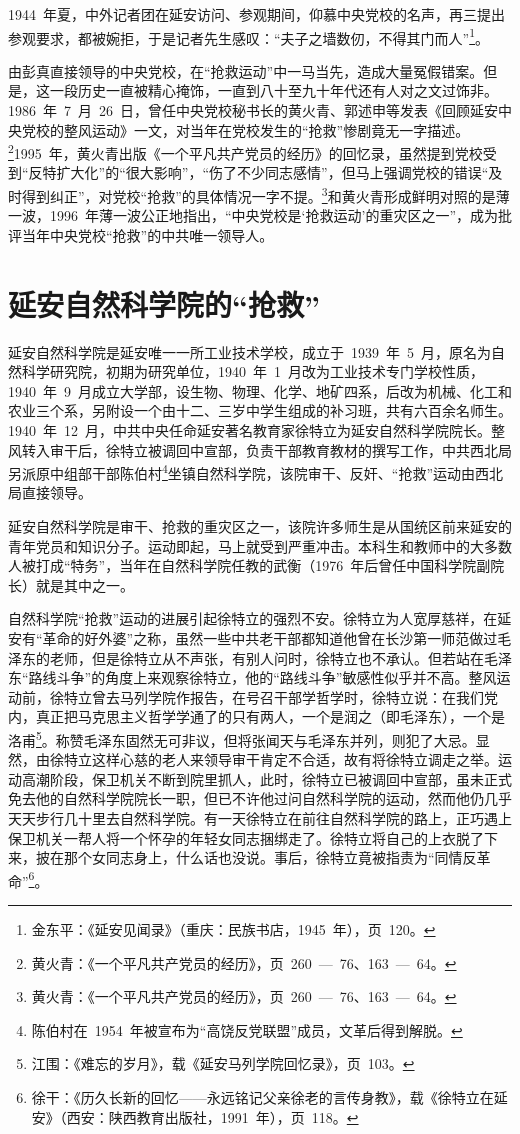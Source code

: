1944~年夏，中外记者团在延安访问、参观期间，仰慕中央党校的名声，再三提出参观要求，都被婉拒，于是记者先生感叹：“夫子之墙数仞，不得其门而人”\footnote{金东平：《延安见闻录》（重庆：民族书店，1945~年），页~120。}。

由彭真直接领导的中央党校，在“抢救运动”中一马当先，造成大量冤假错案。但是，这一段历史一直被精心掩饰，一直到八十至九十年代还有人对之文过饰非。1986~年~7~月~26~日，曾任中央党校秘书长的黄火青、郭述申等发表《回顾延安中央党校的整风运动》一文，对当年在党校发生的“抢救”惨剧竟无一字描述。\footnote{黄火青：《一个平凡共产党员的经历》，页~260~—~76、163~—~64。}1995~年，黄火青出版《一个平凡共产党员的经历》的回忆录，虽然提到党校受到“反特扩大化”的“很大影响”，“伤了不少同志感情”，但马上强调党校的错误“及时得到纠正”，对党校“抢救”的具体情况一字不提。\footnote{黄火青：《一个平凡共产党员的经历》，页~260~—~76、163~—~64。}和黄火青形成鲜明对照的是薄一波，1996~年薄一波公正地指出，“中央党校是‘抢救运动’的重灾区之一”，成为批评当年中央党校“抢救”的中共唯一领导人。

\section{延安自然科学院的“抢救”}

延安自然科学院是延安唯一一所工业技术学校，成立于~1939~年~5~月，原名为自然科学研究院，初期为研究单位，1940~年~1~月改为工业技术专门学校性质，1940~年~9~月成立大学部，设生物、物理、化学、地矿四系，后改为机械、化工和农业三个系，另附设一个由十二、三岁中学生组成的补习班，共有六百余名师生。1940~年~12~月，中共中央任命延安著名教育家徐特立为延安自然科学院院长。整风转入审干后，徐特立被调回中宣部，负责干部教育教材的撰写工作，中共西北局另派原中组部干部陈伯村\footnote{陈伯村在~1954~年被宣布为“高饶反党联盟”成员，文革后得到解脱。}坐镇自然科学院，该院审干、反奸、“抢救”运动由西北局直接领导。

延安自然科学院是审干、抢救的重灾区之一，该院许多师生是从国统区前来延安的青年党员和知识分子。运动即起，马上就受到严重冲击。本科生和教师中的大多数人被打成“特务”，当年在自然科学院任教的武衡（1976~年后曾任中国科学院副院长）就是其中之一。

自然科学院“抢救”运动的进展引起徐特立的强烈不安。徐特立为人宽厚慈祥，在延安有“革命的好外婆”之称，虽然一些中共老干部都知道他曾在长沙第一师范做过毛泽东的老师，但是徐特立从不声张，有别人问时，徐特立也不承认。但若站在毛泽东“路线斗争”的角度上来观察徐特立，他的“路线斗争”敏感性似乎并不高。整风运动前，徐特立曾去马列学院作报告，在号召干部学哲学时，徐特立说：在我们党内，真正把马克思主义哲学学通了的只有两人，一个是润之（即毛泽东），一个是洛甫\footnote{江围：《难忘的岁月》，载《延安马列学院回忆录》，页~103。}。称赞毛泽东固然无可非议，但将张闻天与毛泽东并列，则犯了大忌。显然，由徐特立这样心慈的老人来领导审干肯定不合适，故有将徐特立调走之举。运动高潮阶段，保卫机关不断到院里抓人，此时，徐特立已被调回中宣部，虽未正式免去他的自然科学院院长一职，但已不许他过问自然科学院的运动，然而他仍几乎天天步行几十里去自然科学院。有一天徐特立在前往自然科学院的路上，正巧遇上保卫机关一帮人将一个怀孕的年轻女同志捆绑走了。徐特立将自己的上衣脱了下来，披在那个女同志身上，什么话也没说。事后，徐特立竟被指责为“同情反革命”\footnote{徐干：《历久长新的回忆——永远铭记父亲徐老的言传身教》，载《徐特立在延安》（西安：陕西教育出版社，1991~年），页~118。}。

